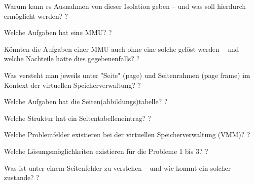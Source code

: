 \documentclass[avery5371]{flashcards}
\begin{document}
\begin{flashcard}[Speichermanagement]{Warum kann es Ausnahmen von dieser Isolation geben – und was soll hierdurch ermöglicht werden? }
    ?
\end{flashcard}

\begin{flashcard}[Speichermanagement]{Welche Aufgaben hat eine MMU? }
    ?
\end{flashcard}

\begin{flashcard}[Speichermanagement]{Könnten die Aufgaben einer MMU auch ohne eine solche gelöst werden – und welche Nachteile hätte dies gegebenenfalls?}
    ?
\end{flashcard}

\begin{flashcard}[Speichermanagement]{Was versteht man jeweils unter "Seite" (page) und Seitenrahmen (page frame) im Kontext der virtuellen Speicherverwaltung? }
    ?
\end{flashcard}

\begin{flashcard}[Speichermanagement]{Welche Aufgaben hat die Seiten(abbildungs)tabelle? }
    ?
\end{flashcard}

\begin{flashcard}[Speichermanagement]{Welche Struktur hat ein Seitentabelleneintrag?}
    ?
\end{flashcard}

\begin{flashcard}[Speichermanagement]{Welche Problemfelder existieren bei der virtuellen Speicherverwaltung (VMM)?}
    ?
\end{flashcard}

\begin{flashcard}[Speichermanagement]{Welche Lösungsmöglichkeiten existieren für die Probleme 1 bis 3?}
    ?
\end{flashcard}

\begin{flashcard}[Speichermanagement]{Was ist unter einem Seitenfehler zu verstehen – und wie kommt ein solcher zustande? }
    ?
\end{flashcard}
\end{document}
